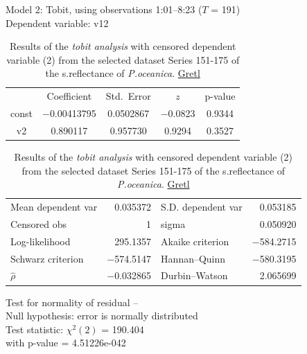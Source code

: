 \documentclass[10pt, a4paper]{article}
\begin{document}
\begin{appendices}
\begin{table}[H]
	\begin{center}
		\caption{Results of the \textit{tobit analysis} with censored dependent variable (2) from the selected dataset Series 151-175 of the s.reflectance of \textit{P.oceanica}. \href{http://gretl.sourceforge.net/}{Gretl}}
			Model 2: Tobit, using observations 1:01--8:23 ($T$ = 191)\\
			Dependent variable: v12\\
		\vspace{1em}
	\begin{tabular}{|c c c c c|}
		  &  {Coefficient} &    {Std.\ Error} & {$z$} & {p-value} \\[1ex]
		const &   $-$0.00413795 &     0.0502867 &     $-$0.0823 &         0.9344 \\
		v2 &   0.890117 &     0.957730 &       0.9294 &         0.3527 \\
	\end{tabular}

	\vspace{1ex}
	\begin{tabular}{lrlr}
		Mean dependent var &  0.035372 & S.D. dependent var &  0.053185 \\
		Censored obs &         1 & sigma &  0.050920 \\
		Log-likelihood &  295.1357 & Akaike criterion & $-$584.2715 \\
		Schwarz criterion & $-$574.5147 & Hannan--Quinn & $-$580.3195 \\
		$\hat{\rho}$ & $-$0.032865 & Durbin--Watson &  2.065699 \\
	\end{tabular}

	\vspace{1em}
	\begin{raggedright}
		Test for normality of residual --\\
		\quad Null hypothesis: error is normally distributed\\
		\quad Test statistic: $\chi^2(2)$ = 190.404\\
		\quad with p-value = 4.51226e-042\\
	\vspace{1ex}
	\end{raggedright}
	\label{tab:25}
	\end{center}
\end{table}


\end{appendices}
\end{document}
